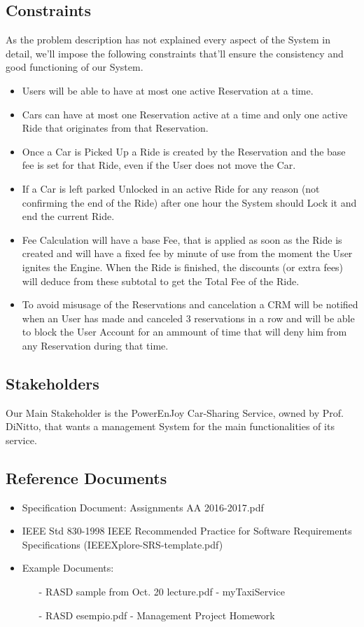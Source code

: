 \documentclass[a4paper]{article}
\begin{document}
\subsection{Constraints}
As the problem description has not explained every aspect of the System in detail, we'll impose the following constraints that'll ensure the consistency and good functioning of our System.
\begin{itemize} 
\item Users will be able to have at most one active Reservation at a time.
\item Cars can have at most one Reservation active at a time and only one active Ride that originates from that Reservation.
\item Once a Car is Picked Up a Ride is created by the Reservation and the base fee is set for that Ride, even if the User does not move the Car.
\item If a Car is left parked Unlocked in an active Ride for any reason (not confirming the end of the Ride) after one hour the System should Lock it and end the current Ride.
\item Fee Calculation will have a base Fee, that is applied as soon as the Ride is created and will have a fixed fee by minute of use from the moment the User ignites the Engine. When the Ride is finished, the discounts (or extra fees) will deduce from these subtotal to get the Total Fee of the Ride.
\item To avoid misusage of the Reservations and cancelation a CRM will be notified when an User has made and canceled 3 reservations in a row and will be able to block the User Account for an ammount of time that will deny him from any Reservation during that time.

\end{itemize}

\subsection{Stakeholders}
Our Main Stakeholder is the PowerEnJoy Car-Sharing Service, owned by Prof. DiNitto, that wants a management System for the main functionalities of its service.

\subsection{Reference Documents}
\begin{itemize}
\item Specification Document: Assignments AA 2016-2017.pdf
\item IEEE Std 830-1998 IEEE Recommended Practice for Software Requirements Specifications (IEEEXplore-SRS-template.pdf)
\item Example Documents:
\begin{itemize}
\item[-] RASD sample from Oct. 20 lecture.pdf - myTaxiService
\item[-] RASD esempio.pdf - Management Project Homework
\end{itemize}
\end{itemize}
\end{document}
